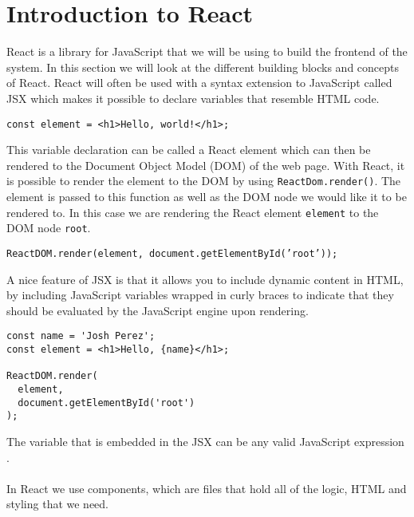 \section{Introduction to React}
React is a library for JavaScript that we will be using to build the frontend of the system.
In this section we will look at the different building blocks and concepts of React.
React will often be used with a syntax extension to JavaScript called JSX \cite{introducingJSX} which makes it possible to declare variables that resemble HTML code.

\begin{center}
    \texttt{const element = <h1>Hello, world!</h1>;}
\end{center}
This variable declaration can be called a React element which can then be rendered to the Document Object Model (DOM) of the web page.
With React, it is possible to render the element to the DOM by using \texttt{ReactDom.render()}.
The element is passed to this function as well as the DOM node we would like it to be rendered to.
In this case we are rendering the React element \texttt{element} to the DOM node \texttt{root}.

\begin{center}
    \texttt{ReactDOM.render(element, document.getElementById('root'));}
\end{center}

A nice feature of JSX is that it allows you to include dynamic content in HTML, by including JavaScript variables wrapped in curly braces to indicate that they should be evaluated by the JavaScript engine upon rendering.

\begin{lstlisting}
const name = 'Josh Perez';
const element = <h1>Hello, {name}</h1>;

ReactDOM.render(
  element,
  document.getElementById('root')
);
\end{lstlisting}
The variable that is embedded in the JSX can be any valid JavaScript expression \cite{introducingJSX}.
\\\\
In React we use components, which are files that hold all of the logic, HTML and styling that we need.

